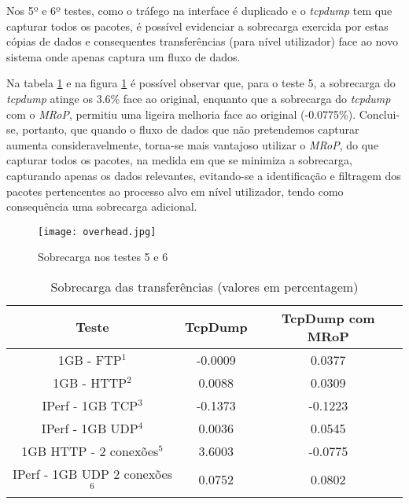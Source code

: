 Nos 5º e 6º testes, como o tráfego na interface é duplicado e o \textit{tcpdump} tem que capturar todos os pacotes, é possível evidenciar a sobrecarga exercida por estas cópias de dados e consequentes transferências (para nível utilizador) face ao novo sistema onde apenas captura um fluxo de dados.



Na tabela \ref{tab:overhead} e na figura \ref{fig:tests_overhead} é possível observar que, para o teste 5, a sobrecarga do \textit{tcpdump} atinge os 3.6\% face ao original, enquanto que a sobrecarga do \textit{tcpdump} com o \textit{MRoP}, permitiu uma ligeira melhoria face ao original (-0.0775\%).
Conclui-se, portanto, que quando o fluxo de dados que não pretendemos capturar aumenta consideravelmente, torna-se mais vantajoso utilizar o \textit{MRoP}, do que capturar todos os pacotes, na medida em que se minimiza a sobrecarga, capturando apenas os dados relevantes, evitando-se a identificação e filtragem dos pacotes pertencentes ao processo alvo em nível utilizador, tendo como consequência uma sobrecarga adicional.

\begin{figure}[!ht]
\centering
\texttt{[image: overhead.jpg]}
\caption{Sobrecarga nos testes 5 e 6 }
\label{fig:tests_overhead}
\end{figure}


\begin{table}[!htb]
\begin{center}
\caption{Sobrecarga das transferências (valores em percentagem)}
\begin{tabular}{ | c | c | c |}
\hline
Teste & \hspace {0.3cm} TcpDump \hspace {0.3cm} & TcpDump com MRoP  \\

\hline
1GB - FTP$^{1}$ & -0.0009  & 0.0377  \\
1GB - HTTP$^{2}$ & 0.0088 &  0.0309   \\
IPerf - 1GB TCP$^{3}$ & -0.1373 &  -0.1223   \\
IPerf - 1GB UDP$^{4}$ & 0.0036 & 0.0545 \\
\hline
\hline
1GB HTTP - 2 conexões$^{5}$ & 3.6003 & -0.0775   \\
IPerf - 1GB UDP 2 conexões$^{6}$ & 0.0752 & 0.0802   \\
\hline
\end{tabular}
\label{tab:overhead}
\end{center}
\end{table}

